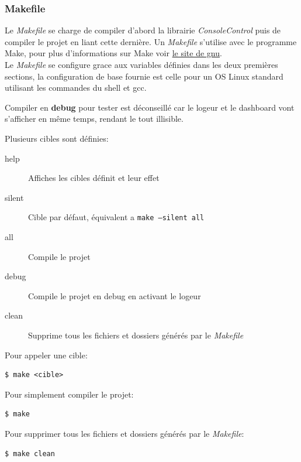\documentclass[article, backcover, french, nodocumentinfo]{upmethodology-document}
\begin{document}
			\subsubsection{Makefile}
				Le \textit{Makefile} se charge de compiler d'abord la librairie \textit{ConsoleControl} puis de compiler le projet en liant cette dernière. Un \textit{Makefile} s'utilise avec le programme Make, pour plus d'informations sur Make voir \href{https://www.gnu.org/software/make/}{le site de gnu}.\\
				Le \textit{Makefile} se configure grace aux variables définies dans les deux premières sections, la configuration de base fournie est celle pour un OS Linux standard utilisant les commandes du shell et gcc.
				\begin{upmcaution}
					Compiler en \textbf{debug} pour tester est déconseillé car le logeur et le dashboard vont s'afficher en même temps, rendant le tout illisible.
				\end{upmcaution}
					Plusieurs cibles sont définies:
					\begin{description}
						\item[help] Affiches les cibles définit et leur effet
						\item[silent] Cible par défaut, équivalent a \texttt{make --silent all}
						\item[all] Compile le projet
						\item[debug] Compile le projet en debug en activant le logeur
						\item[clean] Supprime tous les fichiers et dossiers générés par le \textit{Makefile}
					\end{description}
					Pour appeler une cible:
					\begin{lstlisting}[breaklines=true,breakatwhitespace=true,breakindent=0pt,columns=fixed,keepspaces=true,frame=single,basicstyle=\footnotesize\sffamily]
$ make <cible>\end{lstlisting}
					Pour simplement compiler le projet:
					\begin{lstlisting}[breaklines=true,breakatwhitespace=true,breakindent=0pt,columns=fixed,keepspaces=true,frame=single,basicstyle=\footnotesize\sffamily]
$ make\end{lstlisting}
					Pour supprimer tous les fichiers et dossiers générés par le \textit{Makefile}:
					\begin{lstlisting}[breaklines=true,breakatwhitespace=true,breakindent=0pt,columns=fixed,keepspaces=true,frame=single,basicstyle=\footnotesize\sffamily]
$ make clean\end{lstlisting}
\end{document}
